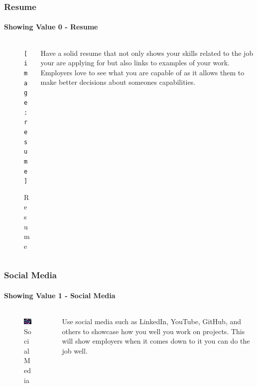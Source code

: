\documentclass[aspectratio=169]{beamer}
\begin{document}
\begin{frame}
  \frametitle{Resume}
  \framesubtitle{Showing Value 0 - Resume}
  \begin{columns}[onlytextwidth]
    \begin{column}{.30\textwidth}
      \begin{figure}
        \texttt{[image: resume]}
        \caption{Resume}
      \end{figure}
    \end{column}
    \hfill
    \begin{column}{.60\textwidth}
        \begin{tcolorbox}[title=resume.log,colback=gray]
          Have a solid resume that not only shows your skills related to the job your are applying for but also links to examples of your work. Employers love to see what you are capable of as it allows them to make better decisions about someones capabilities.
        \end{tcolorbox}
    \end{column}
  \end{columns}
\end{frame}

\begin{frame}
  \frametitle{Social Media}
  \framesubtitle{Showing Value 1 - Social Media}
  \begin{columns}[onlytextwidth]
    \begin{column}{.30\textwidth}
      \begin{figure}
        \includegraphics[width=5.5cm,keepaspectratio]{social_media}
        \caption{Social Media}
      \end{figure}
    \end{column}
    \hfill
    \begin{column}{.60\textwidth}
        \begin{tcolorbox}[title=social\_media.log,colback=gray]
          Use social media such as LinkedIn, YouTube, GitHub, and others to showcase how you well you work on projects. This will show employers when it comes down to it you can do the job well.
        \end{tcolorbox}
    \end{column}
  \end{columns}
\end{frame}
\end{document}

